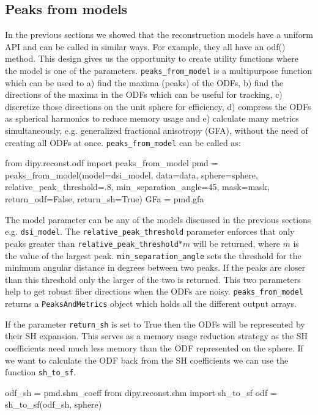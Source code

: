 \documentclass{bioinfo}
\begin{document}
\subsection{Peaks from models}
In the previous sections we showed that the reconstruction models have a uniform API and can be called in similar ways. For example, they all have an odf() method. This design gives us the opportunity to create utility functions where the model is one of the parameters. \texttt{peaks\_from\_model} is a multipurpose function which can be used to a) find the maxima (peaks) of the ODFs, b) find the directions of the maxima in the ODFs which can be useful for tracking, c) discretize those directions on the unit sphere for efficiency, d) compress the ODFs as spherical harmonics to reduce memory usage and e) calculate many metrics simultaneously, e.g. generalized fractional anisotropy (GFA), without the need of creating all ODFs at once. \texttt{peaks\_from\_model} can be called as:
\begin{python}
from dipy.reconst.odf import peaks_from_model
pmd = peaks_from_model(model=dsi_model,
                       data=data,
                       sphere=sphere,
                       relative_peak_threshold=.8,
                       min_separation_angle=45,
                       mask=mask,
                       return_odf=False,
                       return_sh=True)
GFa = pmd.gfa
\end{python}
The model parameter can be any of the models discussed in the previous sections e.g. \texttt{dsi\_model}. The \texttt{relative\_peak\_threshold} parameter enforces that only peaks
greater than \texttt{relative\_peak\_threshold}$*m$ will be returned, where $m$ is the value of the largest peak. \texttt{min\_separation\_angle} sets the threshold for the minimum angular distance in degrees between two peaks. If the peaks are closer than this threshold only the larger of the two is returned. This two parameters help to get robust fiber directions when the ODFs are noisy. \texttt{peaks\_from\_model} returns a \texttt{PeaksAndMetrics} object which holds all the different output arrays.

If the parameter \texttt{return\_sh} is set to True then the ODFs will be represented by their SH expansion. This serves as a memory usage reduction strategy as the SH coefficients need much less memory than the ODF represented on the sphere. If we want to calculate the ODF back from the SH coefficients we can use the function \texttt{sh\_to\_sf}.
\begin{python}
odf_sh = pmd.shm_coeff
from dipy.reconst.shm import sh_to_sf
odf = sh_to_sf(odf_sh, sphere)
\end{python}
\end{document}
